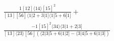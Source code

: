 \documentclass[varwidth, border=5pt]{standalone}
\begin{document}
\begin{my}
$\begin{gathered}
\scriptscriptstyle\frac{1[12]⟨14⟩[15]^2}{[13][56]⟨1|2+3|1]⟨1|5+6|1]}+\\
\scriptscriptstyle\frac{-1[15]^2⟨34⟩⟨3|1+2|3]}{[13]⟨23⟩[56](⟨2|3|5+6|1|2]-⟨3|4|5+6|1|3])}\phantom{+}
\end{gathered}$
\end{my}
\end{document}
